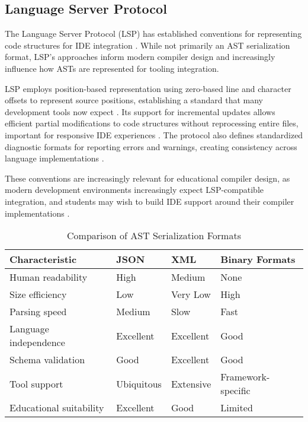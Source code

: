 \subsection{Language Server Protocol}

The Language Server Protocol (LSP) has established conventions for representing code structures for IDE integration \cite{microsoft2016language}. While not primarily an AST serialization format, LSP's approaches inform modern compiler design and increasingly influence how ASTs are represented for tooling integration.

LSP employs position-based representation using zero-based line and character offsets to represent source positions, establishing a standard that many development tools now expect \cite{microsoft2016language}. Its support for incremental updates allows efficient partial modifications to code structures without reprocessing entire files, important for responsive IDE experiences \cite{microsoft2016language}. The protocol also defines standardized diagnostic formats for reporting errors and warnings, creating consistency across language implementations \cite{microsoft2016language}.

These conventions are increasingly relevant for educational compiler design, as modern development environments increasingly expect LSP-compatible integration, and students may wish to build IDE support around their compiler implementations \cite{microsoft2016language}.

\begin{table}[h!]
    \centering
    \caption{Comparison of AST Serialization Formats}
    \label{tab:serialization-comparison}
    \begin{tabularx}{\textwidth}{|
        >{\raggedright\arraybackslash}p{2.5cm}|
        >{\centering\arraybackslash}X|
        >{\centering\arraybackslash}X|
        >{\centering\arraybackslash}X|
      }
      \hline
      \textbf{Characteristic} & \textbf{JSON} & \textbf{XML} & \textbf{Binary Formats} \\
      \hline
      Human readability     & High          & Medium       & None                   \\
      \hline
      Size efficiency       & Low           & Very Low     & High                   \\
      \hline
      Parsing speed         & Medium        & Slow         & Fast                   \\
      \hline
      Language independence & Excellent     & Excellent    & Good                   \\
      \hline
      Schema validation     & Good          & Excellent    & Good                   \\
      \hline
      Tool support          & Ubiquitous    & Extensive    & Framework-specific     \\
      \hline
      Educational suitability & Excellent   & Good         & Limited                \\
      \hline
    \end{tabularx}
\end{table}


